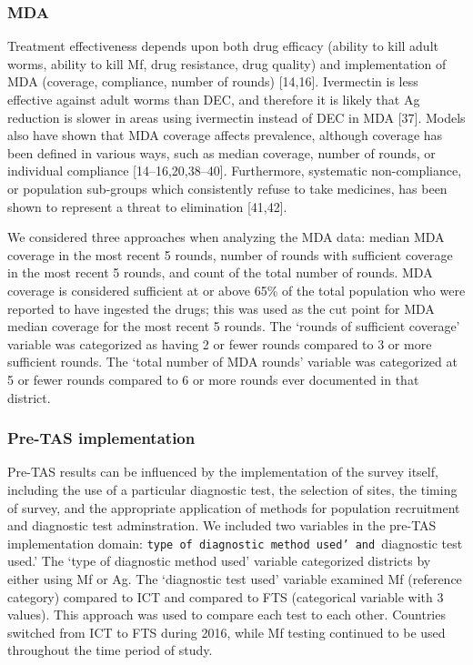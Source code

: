 \documentclass[11pt,a4paper]{article}
\begin{document}
\subsubsection{MDA}

Treatment effectiveness depends upon both drug efficacy (ability to kill adult worms, ability to kill Mf, drug resistance, drug quality) and implementation of MDA (coverage, compliance, number of rounds) [14,16]. Ivermectin is less effective against adult worms than DEC, and therefore it is likely that Ag reduction is slower in areas using ivermectin instead of DEC in MDA [37]. Models also have shown that MDA coverage affects prevalence, although coverage has been defined in various ways, such as median coverage, number of rounds, or individual compliance [14–16,20,38–40]. Furthermore, systematic non-compliance, or population sub-groups which consistently refuse to take medicines, has been shown to represent a threat to elimination [41,42].

We considered three approaches when analyzing the MDA data: median MDA coverage in the most recent 5 rounds, number of rounds with sufficient coverage in the most recent 5 rounds, and count of the total number of rounds. MDA coverage is considered sufficient at or above 65\% of the total population who were reported to have ingested the drugs; this was used as the cut point for MDA median coverage for the most recent 5 rounds. The ‘rounds of sufficient coverage’ variable was categorized as having 2 or fewer rounds compared to 3 or more sufficient rounds. The ‘total number of MDA rounds’ variable was categorized at 5 or fewer rounds compared to 6 or more rounds ever documented in that district.

\subsubsection{Pre-TAS implementation}

Pre-TAS results can be influenced by the implementation of the survey itself, including the use of a particular diagnostic test, the selection of sites, the timing of survey, and the appropriate application of methods for population recruitment and diagnostic test adminstration. We included two variables in the pre-TAS implementation domain: \texttt{type of diagnostic method used’ and }diagnostic test used.’ The ‘type of diagnostic method used’ variable categorized districts by either using Mf or Ag. The ‘diagnostic test used’ variable examined Mf (reference category) compared to ICT and compared to FTS (categorical variable with 3 values). This approach was used to compare each test to each other. Countries switched from ICT to FTS during 2016, while Mf testing continued to be used throughout the time period of study.
\end{document}
